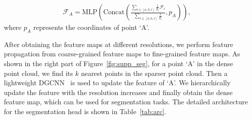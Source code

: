 \begin{appendix}
\begin{equation}
    \begin{split}
        \mathcal{F}_A = \text{MLP} (\text{Concat}(\frac{\sum_{i \in [a,b,c]} \frac{1}{d_i} \mathcal{F}_{i}}{\sum_{i \in [a,b,c]} \frac{1}{d_i}}, p_A)), 
    \end{split}
\end{equation}
\noindent where $p_A$ represents the coordinates of point `A'.

After obtaining the feature maps at different resolutions, we perform feature propagation from coarse-grained feature maps to fine-grained feature maps. As shown in the right part of Figure~\ref{fig:supp_seg}, for a point `A' in the dense point cloud, we find its $k$ nearest points in the sparser point cloud. Then a lightweight DGCNN~\cite{wang2019dynamic} is used to update the feature of `A'. We hierarchically update the feature with the resolution increases and finally obtain the dense feature map, which can be used for segmentation tasks. The detailed architecture for the segmentation head is shown in Table~\ref{tab:arc}. 

\end{appendix}

